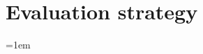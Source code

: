 \documentclass[12pt]{report}
\begin{document}
\section{Evaluation strategy}





\emergencystretch=1em
\printbibliography
\end{document}
